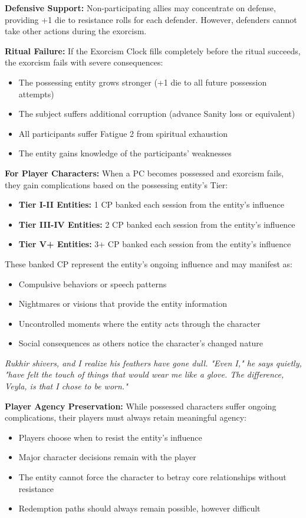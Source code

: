 \documentclass[12pt,twoside]{book}
\newcommand{\shadow}[1]{\textit{#1}}
\begin{document}
\textbf{Defensive Support:}
Non-participating allies may concentrate on defense, providing +1 die to resistance rolls for each defender. However, defenders cannot take other actions during the exorcism.

\textbf{Ritual Failure:}
If the Exorcism Clock fills completely before the ritual succeeds, the exorcism fails with severe consequences:
\begin{itemize}
\item The possessing entity grows stronger (+1 die to all future possession attempts)
\item The subject suffers additional corruption (advance Sanity loss or equivalent)
\item All participants suffer Fatigue 2 from spiritual exhaustion
\item The entity gains knowledge of the participants' weaknesses
\end{itemize}

\textbf{For Player Characters:}
When a PC becomes possessed and exorcism fails, they gain complications based on the possessing entity's Tier:
\begin{itemize}
\item \textbf{Tier I-II Entities:} 1 CP banked each session from the entity's influence
\item \textbf{Tier III-IV Entities:} 2 CP banked each session from the entity's influence  
\item \textbf{Tier V+ Entities:} 3+ CP banked each session from the entity's influence
\end{itemize}

These banked CP represent the entity's ongoing influence and may manifest as:
\begin{itemize}
\item Compulsive behaviors or speech patterns
\item Nightmares or visions that provide the entity information
\item Uncontrolled moments where the entity acts through the character
\item Social consequences as others notice the character's changed nature
\end{itemize}

\shadow{Rukhir shivers, and I realize his feathers have gone dull. "Even I," he says quietly, "have felt the touch of things that would wear me like a glove. The difference, Veyla, is that I chose to be worn."}

\textbf{Player Agency Preservation:}
While possessed characters suffer ongoing complications, their players must always retain meaningful agency:
\begin{itemize}
\item Players choose when to resist the entity's influence
\item Major character decisions remain with the player
\item The entity cannot force the character to betray core relationships without resistance
\item Redemption paths should always remain possible, however difficult
\end{itemize}
\end{document}
